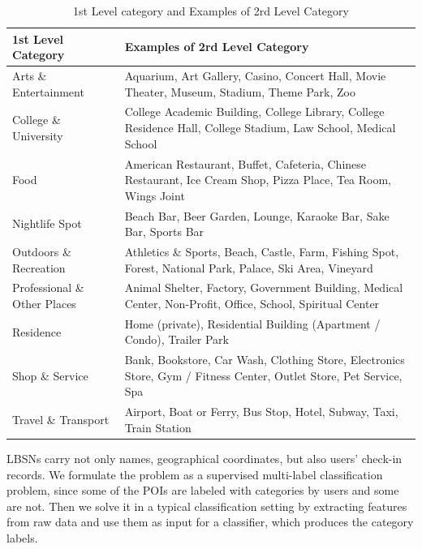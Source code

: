 \begin{table}
\caption{1st Level category and Examples of 2rd Level Category}
\label{tab:Categories}
\begin{tabular}{p{4cm}|p{10cm}}
\hline

1st Level Category&	Examples of 2rd Level Category\\
\hline
Arts \& Entertainment&	Aquarium, Art Gallery, Casino, Concert Hall, Movie Theater, Museum, Stadium, Theme Park, Zoo\\
\hline
College \& University&	College Academic Building, College Library, College Residence Hall, College Stadium, Law School, Medical School\\
\hline
Food&	American Restaurant, Buffet, Cafeteria, Chinese Restaurant, Ice Cream Shop, Pizza Place, Tea Room, Wings Joint\\
\hline
Nightlife Spot&	Beach Bar, Beer Garden, Lounge, Karaoke Bar, Sake Bar, Sports Bar\\
\hline
Outdoors \& Recreation&	Athletics \& Sports, Beach, Castle, Farm, Fishing Spot, Forest, National Park, Palace, Ski Area, Vineyard\\
\hline
Professional \& Other Places&	Animal Shelter, Factory, Government Building, Medical Center, Non-Profit, Office, School, Spiritual Center\\
\hline
Residence&	Home (private), Residential Building (Apartment / Condo), Trailer Park\\
\hline
Shop \& Service&	Bank, Bookstore, Car Wash, Clothing Store, Electronics Store, Gym / Fitness Center, Outlet Store, Pet Service, Spa\\
\hline
Travel \& Transport&	Airport, Boat or Ferry, Bus Stop, Hotel, Subway, Taxi, Train Station\\
\hline
\end{tabular}
\end{table}

LBSNs carry not only
names, geographical coordinates, but also users' check-in records.
We formulate the problem as a supervised multi-label classification problem,
since some of the POIs are labeled with categories by users and some are not.
Then we solve it in a typical classification setting by extracting features
from raw data and use them as input for a classifier, which produces the
category labels.

